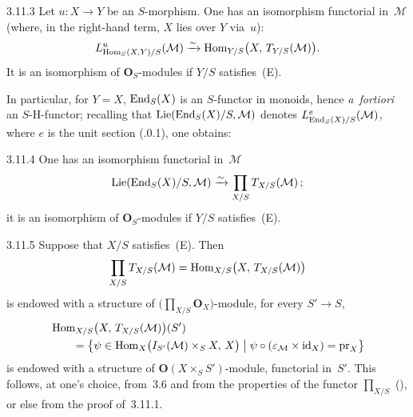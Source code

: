 \begin{corollary}{3.11.3}\label{II.3.11.3}
Let \(u\colon X\to Y\) be an \(S\)-morphism. One has an isomorphism
functorial in~\(\mathcal{M}\) (where, in the right-hand term, \(X\) lies over
\(Y\) via~\(u\)):
\[
L^{u}_{\operatorname{Hom}_{S}(X,Y)/S}(\mathcal{M})
  \xrightarrow{\sim}
\operatorname{Hom}_{Y/S}\bigl(X,\,T_{Y/S}(\mathcal{M})\bigr).
\]
{\renewcommand{\thefootnote}{(38)}}
It is an isomorphism of \(\mathbf{O}_{S}\)-modules if \(Y/S\) satisfies~(E).
\end{corollary}

In particular, for \(Y=X\), \(\operatorname{End}_{S}(X)\) is an \(S\)-functor in monoids, hence
\emph{a~fortiori} an \(S\)-H-functor; recalling that
\(\operatorname{Lie}(\operatorname{End}_{S}(X)/S,\mathcal{M})\) denotes
\(L^{e}_{\operatorname{End}_{S}(X)/S}(\mathcal{M})\), where \(e\) is the unit section
(.0.1), one obtains:

\begin{corollary}{3.11.4}\label{II.3.11.4}
One has an isomorphism functorial in~\(\mathcal{M}\)
\[
\operatorname{Lie}(\operatorname{End}_{S}(X)/S,\mathcal{M})
  \xrightarrow{\sim}
\prod_{X/S}T_{X/S}(\mathcal{M})\,;
\]
{\renewcommand{\thefootnote}{(38)}\footnotemark[38]}
it is an isomorphism of \(\mathbf{O}_{S}\)-modules if \(Y/S\) satisfies~(E).
\end{corollary}

\begin{remark}{3.11.5}\label{II.3.11.5}
{\renewcommand{\thefootnote}{(39)}}
Suppose that \(X/S\) satisfies~(E). Then
\[
\prod_{X/S}T_{X/S}(\mathcal{M})
  =\operatorname{Hom}_{X/S}\bigl(X,\,T_{X/S}(\mathcal{M})\bigr)
\]
is endowed with a structure of
\(\bigl(\prod_{X/S}\mathbf{O}_{X}\bigr)\)-module, \ie for every \(S'\to S\),
\begin{equation*}
\begin{aligned}
&\operatorname{Hom}_{X/S}\bigl(X,\,T_{X/S}(\mathcal{M})\bigr)(S') \\
&\qquad
=\bigl\{\psi\in\operatorname{Hom}_{X}\bigl(I_{S'}(\mathcal{M})\times_{S}X,\,X\bigr)
  \bigm|
  \psi\circ(\varepsilon_{\mathcal{M}}\times\mathrm{id}_{X})
  =\mathrm{pr}_{X}\bigr\}
\end{aligned}
\end{equation*}
is endowed with a structure of \(\mathbf{O}(X\times_{S}S')\)-module, functorial
in~\(S'\). This follows, at one's choice, from~3.6 and from the properties of
the functor \(\prod_{X/S}\) (), or else from the proof of~3.11.1.
\end{remark}

